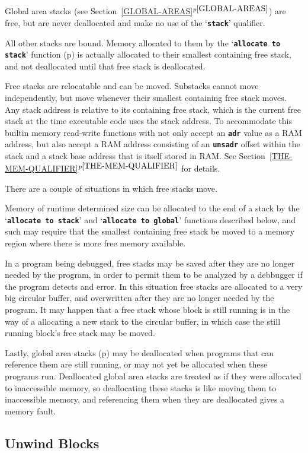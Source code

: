 \documentclass[12pt]{article}
\newcommand{\TT}[1]{{\tt \bfseries #1}}
\newcommand{\itemref}[1]{\ref{#1}$^{p\pageref{#1}}$}
\newcommand{\pagref}[1]{p\pageref{#1}}
\begin{document}
Global area stacks (see Section~\itemref{GLOBAL-AREAS}) are free,
but are never deallocated and make no use of the `\TT{stack}'
qualifier.

All other stacks are bound.  Memory allocated to them
by the `\TT{allocate to stack}' function (\pagref{ALLOCATE-TO-STACK})
is actually
allocated to their smallest containing free stack, and not deallocated
until that free stack is deallocated.

Free stacks are relocatable and can be moved.
Substacks cannot move independently,
but move whenever their smallest containing free stack moves.
Any stack address is relative to its containing free stack,
which is the current free stack at the time executable code uses
the stack address.  To accommodate this builtin memory read-write
functions with not only accept an \TT{adr} value as a RAM address,
but also accept a RAM address consisting of an \TT{unsadr}
offset within the stack and a stack base address that is itself
stored in RAM.  See Section~\itemref{THE-MEM-QUALIFIER} for details.

There are a couple of situations in which free stacks move.

Memory of runtime determined size can be allocated to the end of
a stack by the `\TT{allocate to stack}' and `\TT{allocate to global}'
functions described below, and such may
require that the smallest containing free stack
be moved to a memory region where there is more free memory available.

In a program being debugged, free stacks may be saved after they are no
longer needed by the program, in order to permit them to be analyzed
by a debbugger if the program detects and error.  In this situation
free stacks are allocated to a very big circular buffer, and overwritten
after they are no longer needed by the program.  It may happen that
a free stack whose block is still running is in the way of a allocating
a new stack to the circular buffer, in which case the still running
block's free stack may be moved.

Lastly, global area stacks (\pagref{GLOBAL-AREAS})
may be deallocated when programs that
can reference them are still running, or may not yet be allocated
when these programs run.  Deallocated global area stacks are treated as if
they were allocated to inaccessible memory, so deallocating these stacks
is like moving them to inaccessible memory, and referencing
them when they are deallocated gives a memory fault.


\subsection{Unwind Blocks}
\label{UNWIND-BLOCKS}
\end{document}
